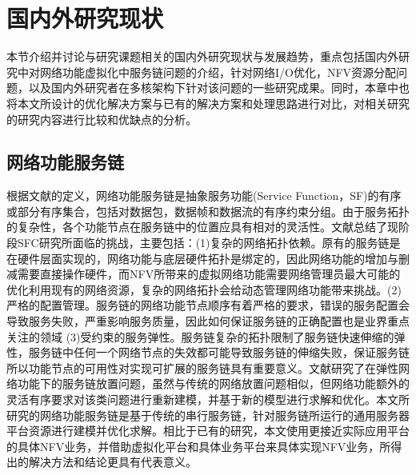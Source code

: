 \section{国内外研究现状}
本节介绍并讨论与研究课题相关的国内外研究现状与发展趋势，重点包括国内外研究中对网络功能虚拟化中服务链问题的介绍，针对网络I/O优化，NFV资源分配问题，以及国内外研究者在多核架构下针对该问题的一些研究成果。同时，本章中也将本文所设计的优化解决方案与已有的解决方案和处理思路进行对比，对相关研究的研究内容进行比较和优缺点的分析。

\subsection{网络功能服务链}
根据文献的定义，网络功能服务链是抽象服务功能(Service Function，SF)的有序或部分有序集合，包括对数据包，数据帧和数据流的有序约束分组。由于服务拓扑的复杂性，各个功能节点在服务链中的位置应具有相对的灵活性。文献总结了现阶段SFC研究所面临的挑战，主要包括：(1)复杂的网络拓扑依赖。原有的服务链是在硬件层面实现的，网络功能与底层硬件拓扑是绑定的，因此网络功能的增加与删减需要直接操作硬件，而NFV所带来的虚拟网络功能需要网络管理员最大可能的优化利用现有的网络资源，复杂的网络拓扑会给动态管理网络功能带来挑战。(2)严格的配置管理。服务链的网络功能节点顺序有着严格的要求，错误的服务配置会导致服务失败，严重影响服务质量，因此如何保证服务链的正确配置也是业界重点关注的领域 (3)受约束的服务弹性。服务链复杂的拓扑限制了服务链快速伸缩的弹性，服务链中任何一个网络节点的失效都可能导致服务链的伸缩失败，保证服务链所以功能节点的可用性对实现可扩展的服务链具有重要意义。文献研究了在弹性网络功能下的服务链放置问题，虽然与传统的网络放置问题相似，但网络功能额外的灵活有序要求对该类问题进行重新建模，并基于新的模型进行求解和优化。本文所研究的网络功能服务链是基于传统的串行服务链，针对服务链所运行的通用服务器平台资源进行建模并优化求解。相比于已有的研究，本文使用更接近实际应用平台的具体NFV业务，并借助虚拟化平台和具体业务平台来具体实现NFV业务，所得出的解决方法和结论更具有代表意义。

